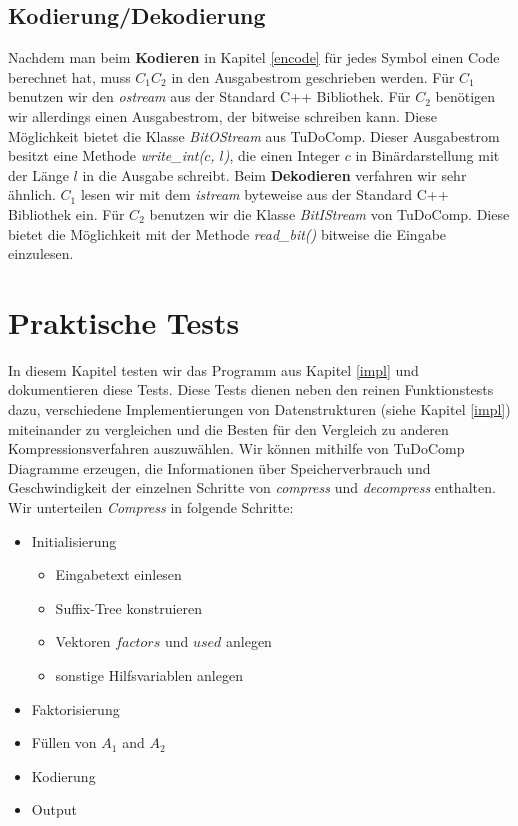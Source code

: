 \documentclass[a4paper,11pt]{scrartcl}%
\theoremstyle{change}
\theoremstyle{nonumberplain}
\theoremstyle{change}
\theoremstyle{nonumberplain}
\theoremstyle{change}
\theoremstyle{nonumberplain}
\begin{document}
\subsection{Kodierung/Dekodierung}


Nachdem man beim \textbf{Kodieren} in Kapitel \ref{encode} für jedes Symbol einen Code berechnet hat, muss $C_1C_2$ in den Ausgabestrom geschrieben werden. Für $C_1$ benutzen wir den \textit{ostream} aus der Standard C++ Bibliothek. Für $C_2$ benötigen wir allerdings einen Ausgabestrom, der bitweise schreiben kann. Diese Möglichkeit bietet die Klasse \textit{BitOStream} aus TuDoComp. Dieser Ausgabestrom besitzt eine Methode \textit{write\_int($c$, $l$)}, die einen Integer $c$ in Binärdarstellung mit der Länge $l$ in die Ausgabe schreibt. 
\newline
\newline
Beim \textbf{Dekodieren} verfahren wir sehr ähnlich. $C_1$ lesen wir mit dem \textit{istream} byteweise aus der Standard C++ Bibliothek ein. Für $C_2$ benutzen wir die Klasse \textit{BitIStream} von TuDoComp. Diese bietet die Möglichkeit mit der Methode \textit{read\_bit()} bitweise die Eingabe einzulesen.



\section{Praktische Tests}\label{tests}

In diesem Kapitel testen wir das Programm aus Kapitel \ref{impl} und dokumentieren diese Tests.
\newline
\newline
Diese Tests dienen neben den reinen Funktionstests dazu, verschiedene Implementierungen von Datenstrukturen (siehe Kapitel \ref{impl}) miteinander zu vergleichen und die Besten für den Vergleich zu anderen Kompressionsverfahren auszuwählen.
\newline
\newline
Wir können mithilfe von TuDoComp Diagramme erzeugen, die Informationen über Speicherverbrauch und Geschwindigkeit der einzelnen Schritte von \textit{compress} und \textit{decompress} enthalten. Wir unterteilen \textit{Compress} in folgende Schritte: 

\begin{itemize}
	\item Initialisierung
		\begin{itemize}
		\item Eingabetext einlesen
		\item Suffix-Tree konstruieren
		\item Vektoren $factors$ und $used$ anlegen
		\item sonstige Hilfsvariablen anlegen
		\end{itemize}
	\item Faktorisierung
	\item Füllen von $A_1$ and $A_2$
	\item Kodierung
	\item Output
\end{itemize}
\end{document}

